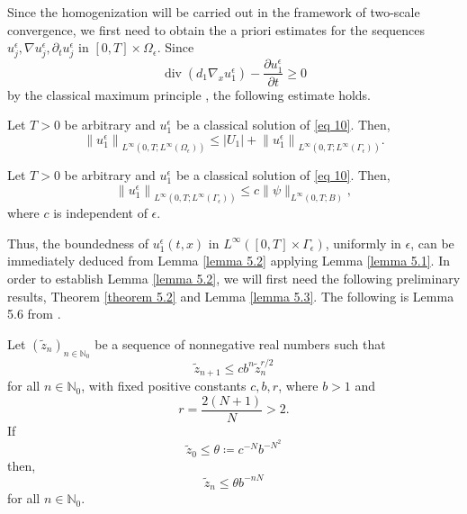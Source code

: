 Since the homogenization will be carried out in the framework of two-scale convergence, we first need to obtain the a priori estimates for the sequences $u_{j}^{\epsilon}, \nabla u_{j}^{\epsilon}, \partial_{t} u_{j}^{\epsilon}$ in $[0, T] \times \Omega_{\epsilon}$.
Since
$$
\operatorname{div}\left(d_{1} \nabla_{x} u_{1}^{\epsilon}\right)-\frac{\partial u_{1}^{\epsilon}}{\partial t} \geq 0
$$
by the classical maximum principle \cite{Protter_Weinberger_1984}, the following estimate holds.
\begin{lemma} Let $T>0$ be arbitrary and $u_{1}^{\epsilon}$ be a classical solution of \eqref{eq 10}. Then,
\begin{equation} \left\|u_{1}^{\epsilon}\right\|_{L^{\infty}\left(0, T ; L^{\infty}\left(\Omega_{\epsilon}\right)\right)} \leq\left|U_{1}\right|+\left\|u_{1}^{\epsilon}\right\|_{L^{\infty}\left(0, T ; L^{\infty}\left(\Gamma_{\epsilon}\right)\right)}. 
\label{eq 20}\end{equation}
\label{lemma 5.1}\end{lemma}
\begin{lemma} Let $T>0$ be arbitrary and $u_{1}^{\epsilon}$ be a classical solution of \eqref{eq 10}. Then,
\begin{equation}
    \left\|u_{1}^{\epsilon}\right\|_{L^{\infty}\left(0, T ; L^{\infty}\left(\Gamma_{\epsilon}\right)\right)} \leq c\|\psi\|_{L^{\infty}(0, T ; B)},
\label{eq 21}\end{equation}where $c$ is independent of $\epsilon$.
\label{lemma 5.2}\end{lemma}
Thus, the boundedness of $u_{1}^{\epsilon}(t, x)$ in $L^{\infty}\left([0, T] \times \Gamma_{\epsilon}\right)$, uniformly in $\epsilon$, can be immediately deduced from Lemma \eqref{lemma 5.2} applying Lemma \eqref{lemma 5.1}.
In order to establish Lemma \eqref{lemma 5.2}, we will first need the following preliminary results, Theorem \eqref{theorem 5.2} and Lemma \eqref{lemma 5.3}.
The following is Lemma 5.6 from \cite{Ladyženskaja_Solonnikov_Uralceva_1968}.
\begin{lemma}Let $\left(\tilde{z}_{n}\right)_{n \in \mathbb{N}_{0}}$ be a sequence of nonnegative real numbers such that
\begin{equation}
    \tilde{z}_{n+1} \leq c b^{n} \tilde{z}_{n}^{r / 2}   
    \label{eq 22}
\end{equation}
for all $n \in \mathbb{N}_{0}$, with fixed positive constants $c, b, r$, where $b>1$ and
$$
    r=\frac{2(N+1)}{N}>2 .
$$
If
\begin{equation}
    \tilde{z}_{0} \leq \theta\coloneqq c^{-N} b^{-N^{2}}
\label{eq 23}
\end{equation}
then,
\begin{equation}
    \tilde{z}_{n} \leq \theta b^{-n N}
\label{eq 24}
\end{equation}
for all $n \in \mathbb{N}_{0}$.
\label{lemma 5.3}
\end{lemma}
